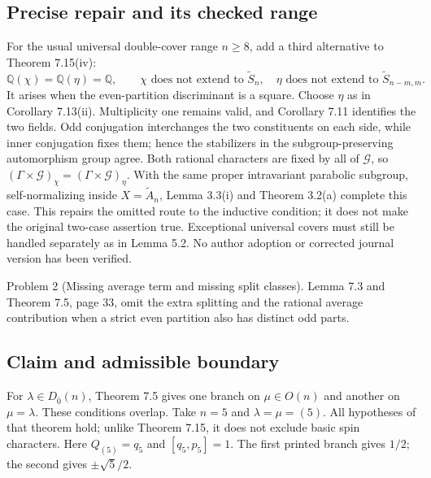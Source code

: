 \documentclass[10pt]{article}
\begin{document}
\subsection*{Precise repair and its checked range}
For the usual universal double-cover range \(n\ge8\), add a third alternative to Theorem 7.15(iv): \[\mathbb{Q}(\chi)=\mathbb{Q}(\eta)=\mathbb{Q},\qquad
 \chi\text{ does not extend to }\widetilde S_n,\quad
 \eta\text{ does not extend to }\widetilde S_{n-m,m}.\] It arises when the even-partition discriminant is a square. Choose \(\eta\) as in Corollary 7.13(ii). Multiplicity one remains valid, and Corollary 7.11 identifies the two fields. Odd conjugation interchanges the two constituents on each side, while inner conjugation fixes them; hence the stabilizers in the subgroup-preserving automorphism group agree. Both rational characters are fixed by all of \(\mathcal G\), so \((\Gamma\times\mathcal G)_\chi=(\Gamma\times\mathcal G)_\eta\). With the same proper intravariant parabolic subgroup, self-normalizing inside \(X=\widetilde A_n\), Lemma 3.3(i) and Theorem 3.2(a) complete this case. This repairs the omitted route to the inductive condition; it does not make the original two-case assertion true. Exceptional universal covers must still be handled separately as in Lemma 5.2. No author adoption or corrected journal version has been verified.\par
Problem 2 (Missing average term and missing split classes).  Lemma 7.3 and Theorem 7.5, page 33, omit the extra splitting and the rational average contribution when a strict even partition also has distinct odd parts.\par
\subsection*{Claim and admissible boundary}
For \(\lambda\in D_{\bar0}(n)\), Theorem 7.5 gives one branch on \(\mu\in O(n)\) and another on \(\mu=\lambda\). These conditions overlap. Take \(n=5\) and \(\lambda=\mu=(5)\). All hypotheses of that theorem hold; unlike Theorem 7.15, it does not exclude basic spin characters. Here \(Q_{(5)}=q_5\) and \([q_5,p_5]=1\). The first printed branch gives \(1/2\); the second gives \(\pm\sqrt5/2\).\par
\end{document}
